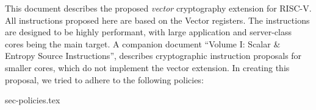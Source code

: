 
This document describes the proposed {\em vector} cryptography
extension for RISC-V.
All instructions proposed here are based on the Vector registers.
The instructions are designed to be highly performant, with large
application and server-class cores being the main target.
A companion document ``Volume I: Scalar \& Entropy Source Instructions'',
describes
cryptographic instruction proposals for smaller cores, which do not
implement the vector extension.
In creating this proposal, we tried to adhere to the following
policies:

{sec-policies.tex}
